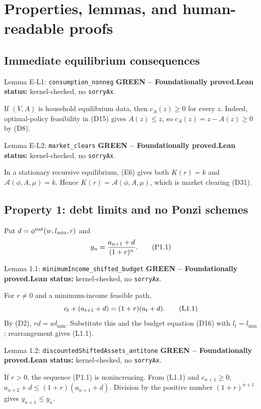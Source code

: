 \documentclass[11pt]{article}
\newcommand{\leanname}[1]{\nolinkurl{#1}}
\newcommand{\eqP}[1]{\refstepcounter{equation}\tag{P#1}}
\newcommand{\eqL}[1]{\refstepcounter{equation}\tag{L#1}}
\newcommand{\formalcheck}{\textbf{Lean status:} kernel-checked, no \texttt{sorryAx}.}
\newcommand{\greenstatus}{\textcolor{proved}{\textbf{GREEN -- Foundationally proved.}}}
\begin{document}
\section{Properties, lemmas, and human-readable proofs}

\subsection{Immediate equilibrium consequences}

\begin{greenbox}{Lemma E-L1: \leanname{consumption_nonneg}}
\greenstatus\quad\formalcheck

If \((V,A)\) is household equilibrium data, then \(c_A(z)\ge0\) for every
\(z\).  Indeed, optimal-policy feasibility in (D15) gives \(A(z)\le z\), so
\(c_A(z)=z-A(z)\ge0\) by (D8).
\end{greenbox}

\begin{greenbox}{Lemma E-L2: \leanname{market_clears}}
\greenstatus\quad\formalcheck

In a stationary recursive equilibrium, (E6) gives both \(K(r)=k\) and
\(\mathcal A(\phi,A,\mu)=k\).  Hence
\(K(r)=\mathcal A(\phi,A,\mu)\), which is market clearing (D31).
\end{greenbox}

\subsection{Property 1: debt limits and no Ponzi schemes}

Put \(d=\phi^{\rm nat}(w,l_{\min},r)\) and
\begin{equation}
 y_n=\frac{a_{n+1}+d}{(1+r)^n}. \eqP{1.1}\label{P1.1}
\end{equation}

\begin{greenbox}{Lemma 1.1: \leanname{minimumIncome_shifted_budget}}
\greenstatus\quad\formalcheck

For \(r\ne0\) and a minimum-income feasible path,
\begin{equation}
 c_t+(a_{t+1}+d)=(1+r)(a_t+d). \eqL{1.1}\label{L1.1}
\end{equation}
By (D2), \(rd=wl_{\min}\).  Substitute this and the budget equation (D16)
with \(l_t=l_{\min}\); rearrangement gives (L1.1).
\end{greenbox}

\begin{greenbox}{Lemma 1.2: \leanname{discountedShiftedAssets_antitone}}
\greenstatus\quad\formalcheck

If \(r>0\), the sequence (P1.1) is nonincreasing.  From (L1.1) and
\(c_{n+1}\ge0\),
\(a_{n+2}+d\le(1+r)(a_{n+1}+d)\).  Division by the positive number
\((1+r)^{n+1}\) gives \(y_{n+1}\le y_n\).
\end{greenbox}
\end{document}
